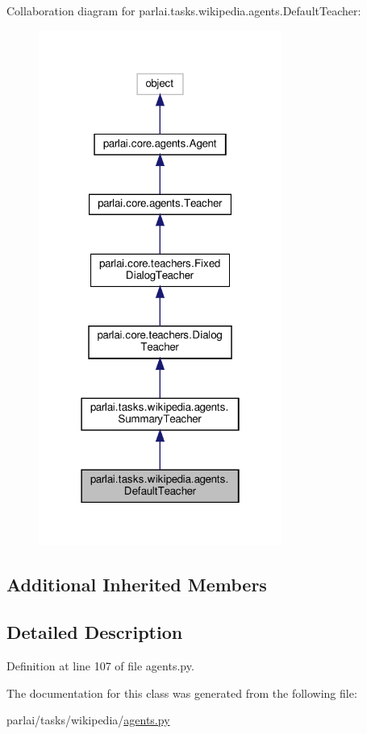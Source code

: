 Collaboration diagram for parlai.\+tasks.\+wikipedia.\+agents.\+Default\+Teacher\+:
\nopagebreak
\begin{figure}[H]
\begin{center}
\leavevmode
\includegraphics[width=226pt]{d1/d96/classparlai_1_1tasks_1_1wikipedia_1_1agents_1_1DefaultTeacher__coll__graph}
\end{center}
\end{figure}
\subsection*{Additional Inherited Members}


\subsection{Detailed Description}


Definition at line 107 of file agents.\+py.



The documentation for this class was generated from the following file\+:\begin{DoxyCompactItemize}
\item 
parlai/tasks/wikipedia/\hyperlink{parlai_2tasks_2wikipedia_2agents_8py}{agents.\+py}\end{DoxyCompactItemize}
